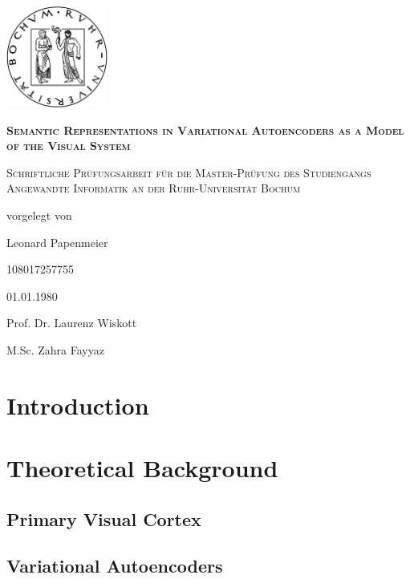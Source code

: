 \documentclass[11pt]{article}
\newcounter{savepage}
\begin{document}
    \begin{titlepage}
        \centering
        \includegraphics[width=0.25\textwidth]{rublogo.png}\par
        {\scshape\huge\bfseries Semantic Representations in Variational Autoencoders as a Model of the Visual System \par}
        {\scshape\large Schriftliche Prüfungsarbeit für die Master-Prüfung des Studiengangs Angewandte Informatik an der Ruhr-Universität Bochum\par}
        \vspace{1em}
        vorgelegt von\par
        \vspace{2em}
        Leonard Papenmeier\par 108017257755\par
        \vspace{2em}
        01.01.1980\par

        \vfill
        Prof. Dr. Laurenz Wiskott\par
        M.Sc. Zahra Fayyaz


    \end{titlepage}
    \tableofcontents
    \newpage

    \section{Introduction}\label{sec:introduction}
    \section{Theoretical Background}\label{sec:theoretical-background}
    \subsection{Primary Visual Cortex}\label{subsec:primary-visual-cortex}
    \subsection{Variational Autoencoders}\label{subsec:variational-autoencoders}
\end{document}
